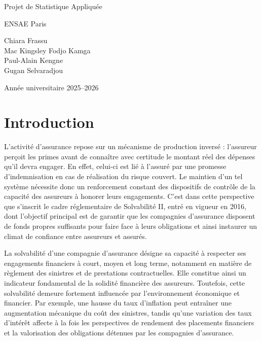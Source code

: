 \documentclass[
]{article}
\author{}
\date{\vspace{-2.5em}}
\begin{document}
\vspace*{4cm}

\begin{center}

{\Huge Projet de Statistique Appliquée}

\vspace{1cm}

{\Large ENSAE Paris}

\vspace{2cm}

Chiara Frassu \\
Mac Kingsley Fodjo Kamga \\
Paul-Alain Kengne \\
Gugan Selvaradjou \\


\vspace{2cm}

Année universitaire 2025–2026

\end{center}

\newpage
\tableofcontents
\newpage

\section{Introduction}\label{introduction}

L'activité d'assurance repose sur un mécanisme de production inversé :
l'assureur perçoit les primes avant de connaître avec certitude le
montant réel des dépenses qu'il devra engager. En effet, celui-ci est
lié à l'assuré par une promesse d'indemnisation en cas de réalisation du
risque couvert. Le maintien d'un tel système nécessite donc un
renforcement constant des dispositifs de contrôle de la capacité des
assureurs à honorer leurs engagements. C'est dans cette perspective que
s'inscrit le cadre réglementaire de Solvabilité II, entré en vigueur en
2016, dont l'objectif principal est de garantir que les compagnies
d'assurance disposent de fonds propres suffisants pour faire face à
leurs obligations et ainsi instaurer un climat de confiance entre
assureurs et assurés.

La solvabilité d'une compagnie d'assurance désigne sa capacité à
respecter ses engagements financiers à court, moyen et long terme,
notamment en matière de règlement des sinistres et de prestations
contractuelles. Elle constitue ainsi un indicateur fondamental de la
solidité financière des assureurs. Toutefois, cette solvabilité demeure
fortement influencée par l'environnement économique et financier. Par
exemple, une hausse du taux d'inflation peut entraîner une augmentation
mécanique du coût des sinistres, tandis qu'une variation des taux
d'intérêt affecte à la fois les perspectives de rendement des placements
financiers et la valorisation des obligations détenues par les
compagnies d'assurance.
\end{document}
